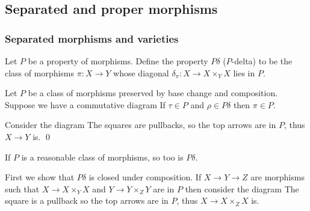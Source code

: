 \subsection{Separated and proper morphisms}

\subsubsection{Separated morphisms and varieties}

\bdefn

    Let $P$ be a property of morphisms.
    Define the property $P\delta$ ($P$-delta) to be the class of morphisms $\pi\colon X\to Y$ whose
    diagonal $\delta_\pi\colon X\to X\times_YX$ lies in $P$.

\edefn

\bthrm[name={cancellationtheorem}, title={The Cancellation Theorem}]

    Let $P$ be a class of morphisms preserved by base change and composition.
    Suppose we have a commutative diagram
    If $\tau\in P$ and $\rho\in P\delta$ then $\pi\in P$.

\ethrm

\bproof

    Consider the diagram
    The squares are pullbacks, so the top arrows are in $P$, thus $X\to Y$ is.
    \qed

\eproof

\bprop

    If $P$ is a reasonable class of morphisms, so too is $P\delta$.

\eprop

\bproof

    First we show that $P\delta$ is closed under composition.
    If $X\to Y\to Z$ are morphisms such that $X\to X\times_YX$ and $Y\to Y\times_ZY$ are in $P$ then
    consider the diagram
    The square is a pullback so the top arrows are in $P$, thus $X\to X\times_ZX$ is.

